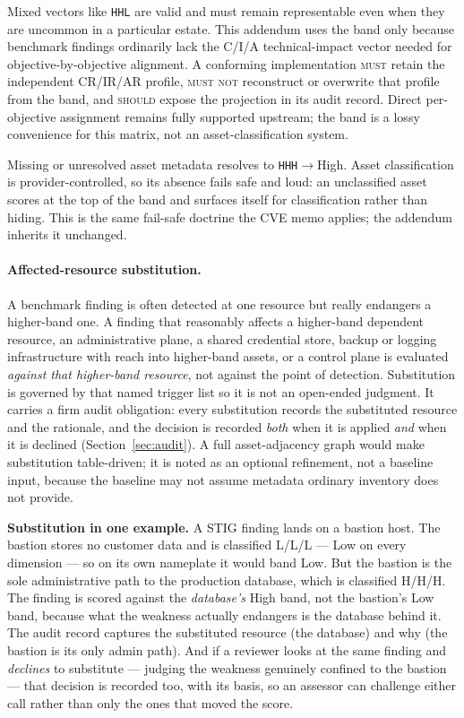 \documentclass[11pt]{article}
\newcommand{\code}[1]{\texttt{#1}}
\newcommand{\rfckw}[1]{\textsc{#1}}
\begin{document}
Mixed vectors like \code{HHL} are valid and must remain representable even when
they are uncommon in a particular estate. This addendum uses the band only because
benchmark findings ordinarily lack the C/I/A technical-impact vector needed for
objective-by-objective alignment. A conforming implementation \rfckw{must} retain
the independent CR/IR/AR profile, \rfckw{must not} reconstruct or overwrite that
profile from the band, and \rfckw{should} expose the projection in its audit record.
Direct per-objective assignment remains fully supported upstream; the band is a
lossy convenience for this matrix, not an asset-classification system.

Missing or unresolved asset metadata resolves to \code{HHH}${}\rightarrow{}$High.
Asset classification is provider-controlled, so its absence fails safe and loud: an
unclassified asset scores at the top of the band and surfaces itself for
classification rather than hiding. This is the same fail-safe doctrine the CVE memo
applies; the addendum inherits it unchanged.

\paragraph{Affected-resource substitution.} A benchmark finding is often detected at
one resource but really endangers a higher-band one. A finding that reasonably
affects a higher-band dependent resource, an administrative plane, a shared
credential store, backup or logging infrastructure with reach into higher-band
assets, or a control plane is evaluated \emph{against that higher-band resource},
not against the point of detection. Substitution is governed by that named trigger
list so it is not an open-ended judgment. It carries a firm audit obligation: every
substitution records the substituted resource and the rationale, and the decision is
recorded \emph{both} when it is applied \emph{and} when it is declined
(Section~\ref{sec:audit}). A full asset-adjacency graph would make substitution
table-driven; it is noted as an optional refinement, not a baseline input, because
the baseline may not assume metadata ordinary inventory does not provide.

\begin{plain}
\textbf{Substitution in one example.} A STIG finding lands on a bastion host. The
bastion stores no customer data and is classified L/L/L --- Low on every dimension ---
so on its own nameplate it would band Low. But the bastion is the sole administrative
path to the production database, which is classified H/H/H. The finding is scored
against the \emph{database's} High band, not the bastion's Low band, because what the
weakness actually endangers is the database behind it. The audit record captures the
substituted resource (the database) and why (the bastion is its only admin path). And
if a reviewer looks at the same finding and \emph{declines} to substitute --- judging
the weakness genuinely confined to the bastion --- that decision is recorded too, with
its basis, so an assessor can challenge either call rather than only the ones that
moved the score.
\end{plain}
\end{document}
